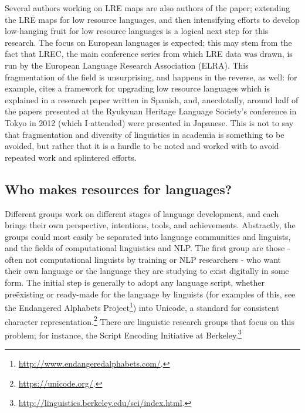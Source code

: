 Several authors working on LRE maps are also authors of the \citet{soria2017digital} paper; extending the LRE maps for low resource languages, and then intensifying efforts to develop low-hanging fruit for low resource languages is a logical next step for this research. The focus on European languages is expected; this may stem from the fact that LREC, the main conference series from which LRE data was drawn, is run by the European Language Research Association (ELRA). This fragmentation of the field is unsurprising, and happens in the reverse, as well: for example, \citet{paricio2010new} cites a framework for upgrading low resource languages which is explained in a research paper written in Spanish, and, anecdotally, around half of the papers presented at the Ryukyuan Heritage Language Society's conference in Tokyo in 2012 (which I attended) were presented in Japanese. This is not to say that fragmentation and diversity of linguistics in academia is something to be avoided, but rather that it is a hurdle to be noted and worked with to avoid repeated work and splintered efforts.


\subsection{Who makes resources for languages?}
\label{subsec:who-makes-resources}

Different groups  work on different stages of language development, and each brings their own perspective, intentions, tools, and achievements. Abstractly, the groups could most easily be separated into language communities and linguists, and the fields of computational linguistics and NLP. The first group are those - often not computational linguists by training or NLP researchers - who want their own language or the language they are studying to exist digitally in some form. The initial step is generally to adopt any language script, whether  pre\"{e}xisting or ready-made for the language by linguists (for examples of this, see the Endangered Alphabets Project\footnote{\href{http://www.endangeredalphabets.com/}{http://www.endangeredalphabets.com/}. }) into Unicode, a standard for consistent character representation.\footnote{\href{https://unicode.org/}{https://unicode.org/}. } There are linguistic research groups that focus on this problem; for instance, the Script Encoding Initiative at Berkeley.\footnote{\href{http://linguistics.berkeley.edu/sei/index.html}{http://linguistics.berkeley.edu/sei/index.html}. }

